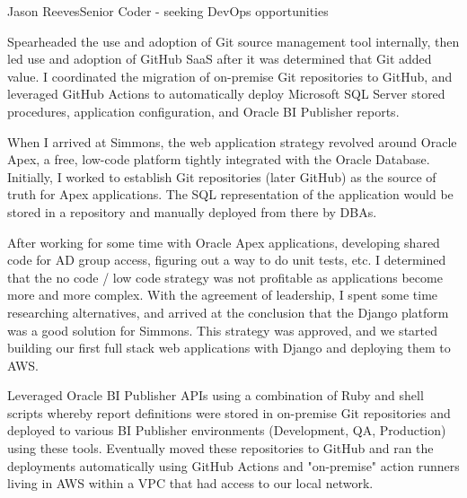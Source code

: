 \documentclass{article}
\begin{document}
\begin{cv}[avatar]{Jason Reeves}{Senior Coder - seeking DevOps opportunities}
\begin{cvevent}[2019-2020]
    Spearheaded the use and adoption of Git source management tool internally, then led use and adoption of GitHub SaaS after it was determined that Git added value.  I coordinated the migration of on-premise Git repositories to GitHub, and leveraged GitHub Actions to automatically deploy Microsoft SQL Server stored procedures, application configuration, and Oracle BI Publisher reports.
    \vspace*{5mm}
\end{cvevent}

\begin{cvevent}[2019]
    When I arrived at Simmons, the web application strategy revolved around Oracle Apex, a free, low-code platform tightly integrated with the Oracle Database.  Initially, I worked to establish Git repositories (later GitHub) as the source of truth for Apex applications.  The SQL representation of the application would be stored in a repository and manually deployed from there by DBAs.

    \vspace*{3mm}
    After working for some time with Oracle Apex applications, developing shared code for AD group access, figuring out a way to do unit tests, etc. I determined that the no code / low code strategy was not profitable as applications become more and more complex.  With the agreement of leadership, I spent some time researching alternatives, and arrived at the conclusion that the Django platform was a good solution for Simmons.  This strategy was approved, and we started building our first full stack web applications with Django and deploying them to AWS.
\end{cvevent}

\begin{cvevent}[2018-2020]
    Leveraged Oracle BI Publisher APIs using a combination of Ruby and shell scripts whereby report definitions were stored in on-premise Git repositories and deployed to various BI Publisher environments (Development, QA, Production) using these tools.  Eventually moved these repositories to GitHub and ran the deployments automatically using GitHub Actions and "on-premise" action runners living in AWS within a VPC that had access to our local network.  
    \vspace*{5mm}
\end{cvevent}


\end{cv}
\end{document}
